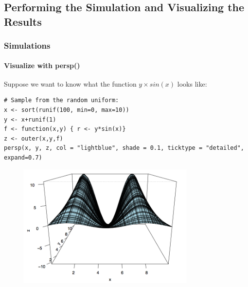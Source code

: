 \subsection{Performing the Simulation and Visualizing the Results}
\begin{frame}
\frametitle{Simulations}
\framesubtitle{Visualize with \ttfamily persp() \normalfont}

Suppose we want to know what the function $y\times sin(x)$ looks like:

\begin{lstlisting}
# Sample from the random uniform:
x <- sort(runif(100, min=0, max=10))
y <- x+runif(1)
f <- function(x,y) { r <- y*sin(x)}
z <- outer(x,y,f)
persp(x, y, z, col = "lightblue", shade = 0.1, ticktype = "detailed", expand=0.7)
\end{lstlisting}

\newpage
   \begin{figure}[ht]
       \begin{center}
		\includegraphics[width = 3.5in]{images/simulation.png}
	\end{center}
   \end{figure}
\end{frame}

